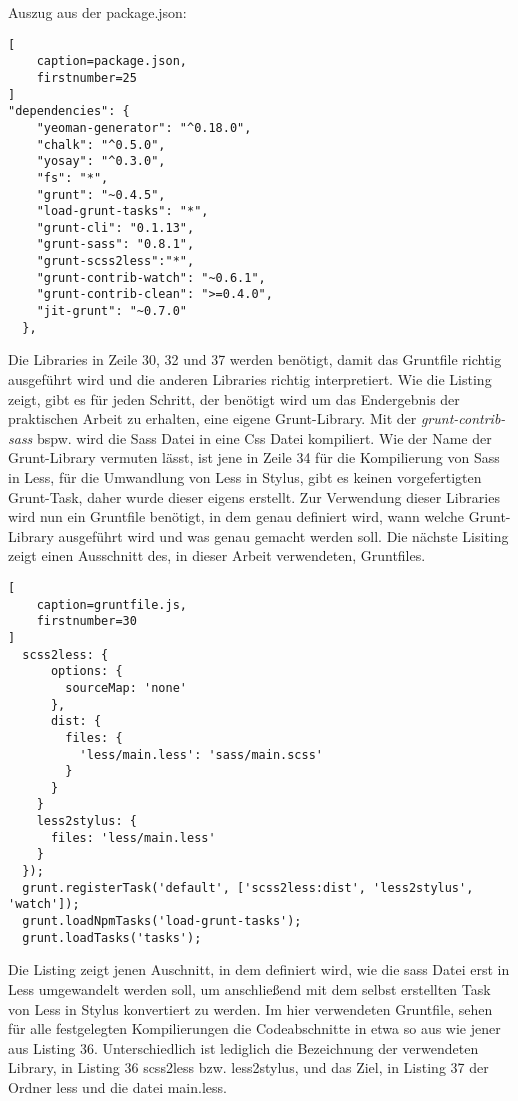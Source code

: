Auszug aus der package.json:
\begin{lstlisting}[
	caption=package.json,
	firstnumber=25
]
"dependencies": {
    "yeoman-generator": "^0.18.0",
    "chalk": "^0.5.0",
    "yosay": "^0.3.0",
    "fs": "*",
    "grunt": "~0.4.5",
    "load-grunt-tasks": "*",
    "grunt-cli": "0.1.13",
    "grunt-sass": "0.8.1",
    "grunt-scss2less":"*",
    "grunt-contrib-watch": "~0.6.1",
    "grunt-contrib-clean": ">=0.4.0",
    "jit-grunt": "~0.7.0"
  },
\end{lstlisting}
Die Libraries in Zeile 30, 32 und 37 werden benötigt, damit das Gruntfile richtig ausgeführt wird und die anderen Libraries richtig interpretiert.
Wie die Listing zeigt, gibt es für jeden Schritt, der benötigt wird um das Endergebnis der praktischen Arbeit zu erhalten, eine eigene Grunt-Library. Mit der \textit{grunt-contrib-sass} bspw. wird die Sass Datei in eine Css Datei kompiliert. \newline
Wie der Name der Grunt-Library vermuten lässt, ist jene in Zeile 34 für die Kompilierung von Sass in Less, für die Umwandlung von Less in Stylus, gibt es keinen vorgefertigten Grunt-Task, daher wurde dieser eigens erstellt.\newline
Zur Verwendung dieser Libraries wird nun ein Gruntfile benötigt, in dem genau definiert wird, wann welche Grunt-Library ausgeführt wird und was genau gemacht werden soll. Die nächste Lisiting zeigt einen Ausschnitt des, in dieser Arbeit verwendeten, Gruntfiles.
\begin{lstlisting}[
	caption=gruntfile.js,
	firstnumber=30
]
  scss2less: {
      options: {
        sourceMap: 'none'
      },
      dist: {
        files: {
          'less/main.less': 'sass/main.scss'
        }
      }
    }
    less2stylus: {
      files: 'less/main.less'
    }
  });
  grunt.registerTask('default', ['scss2less:dist', 'less2stylus', 'watch']);
  grunt.loadNpmTasks('load-grunt-tasks');
  grunt.loadTasks('tasks');
\end{lstlisting}
Die Listing zeigt jenen Auschnitt, in dem definiert wird, wie die sass Datei erst in Less umgewandelt werden soll, um anschließend mit dem selbst erstellten Task von Less in Stylus konvertiert zu werden.\newline
Im hier verwendeten Gruntfile, sehen für alle festgelegten Kompilierungen die Codeabschnitte in etwa so aus wie jener aus Listing 36. Unterschiedlich ist lediglich die Bezeichnung der verwendeten Library, in Listing 36 scss2less bzw. less2stylus, und das Ziel, in Listing 37 der Ordner less und die datei main.less.\newline
